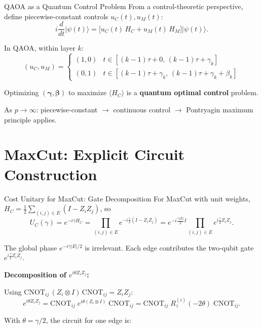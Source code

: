 \documentclass{beamer}
\begin{document}
\begin{frame}{QAOA as a Quantum Control Problem}
From a control-theoretic perspective, define piecewise-constant
controls $u_C(t), u_M(t)$:
\[
i\frac{d}{dt}|\psi(t)\rangle
= \bigl[u_C(t)\,H_C + u_M(t)\,H_M\bigr]|\psi(t)\rangle.
\]

In QAOA, within layer $k$:
\[
(u_C,u_M) = \begin{cases}
(1,0) & t\in[(k-1)\tau + 0,\,(k-1)\tau+\gamma_k] \\
(0,1) & t\in[(k-1)\tau + \gamma_k,\,(k-1)\tau+\gamma_k+\beta_k]
\end{cases}
\]

Optimizing $(\boldsymbol{\gamma},\boldsymbol{\beta})$ to maximize
$\langle H_C\rangle$ is a \textbf{quantum optimal control} problem.

\medskip

As $p\to\infty$:  piecewise-constant $\to$ continuous control
$\to$ Pontryagin maximum principle applies.
\end{frame}


\section{MaxCut: Explicit Circuit Construction}

\begin{frame}{Cost Unitary for MaxCut: Gate Decomposition}
For MaxCut with unit weights,
$H_C = \tfrac{1}{2}\sum_{(i,j)\in E}(I - Z_iZ_j)$, so
\[
U_C(\gamma)
= e^{-i\gamma H_C}
= \prod_{(i,j)\in E} e^{-i\frac{\gamma}{2}(I - Z_iZ_j)}
= e^{-i\frac{\gamma|E|}{2}I}
  \prod_{(i,j)\in E} e^{i\frac{\gamma}{2}Z_iZ_j}.
\]

The global phase $e^{-i\gamma|E|/2}$ is irrelevant. Each edge
contributes the two-qubit gate $e^{i\frac{\gamma}{2}Z_iZ_j}$.

\medskip

\textbf{Decomposition of $e^{i\theta Z_i Z_j}$:}

Using $\mathrm{CNOT}_{ij}\,(Z_i\otimes I)\,\mathrm{CNOT}_{ij} = Z_i Z_j$:
\[
e^{i\theta Z_iZ_j}
= \mathrm{CNOT}_{ij}\;
e^{i\theta(Z_i\otimes I)}\;
\mathrm{CNOT}_{ij}
= \mathrm{CNOT}_{ij}\;R_z^{(i)}(-2\theta)\;\mathrm{CNOT}_{ij}.
\]

With $\theta = \gamma/2$, the circuit for one edge is:
\end{frame}

\end{document}
